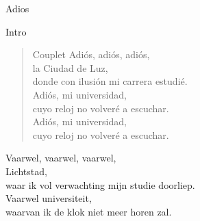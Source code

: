\begin{song}[tango]{Adios}

\begin{instrumental}{Intro}
 \measure{} \measure{} \measure{}  \measure{}    \measure{}  \measure{}  \measure{}  \measure*{}
\end{instrumental}


\begin{verse}{Couplet}
Adiós, adiós, adiós,\\
\chord{}la Ciudad de Luz,\\
donde con ilusión mi carrera estudié.\\
Adiós, mi universidad,\\
cuyo reloj no volveré a escuchar.\\
Adiós, mi universidad,\\
cuyo reloj no volveré a escuchar.\\
\end{verse}
\repetition{[Fonseca]}
\end{song}
\begin{translation}
Vaarwel, vaarwel, vaarwel,\\
Lichtstad,\\
waar ik vol verwachting mijn studie doorliep.\\
Vaarwel universiteit,\\
waarvan ik de klok niet meer horen zal.\\
\end{translation}
